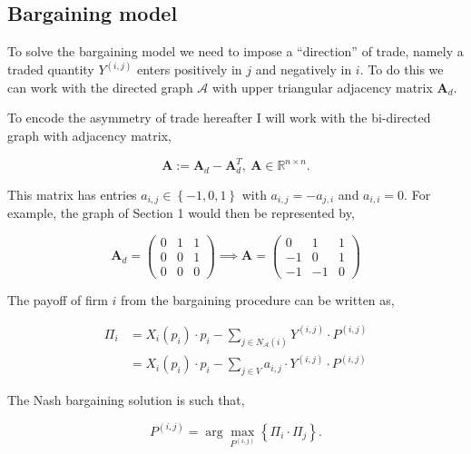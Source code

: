 \documentclass[american]{scrartcl}
\newcommand{\R}{\mathbb{R}}
\newcommand{\matr}[1]{\bm{#1}}
\newcommand{\set}[1]{\left\{#1\right\}}
\begin{document}
\subsection{Bargaining model}

To solve the bargaining model we need to impose a ``direction'' of trade, namely a traded quantity $Y^{(i, j)}$ enters positively in $j$ and negatively in $i$. To do this we can work with the directed graph $\mathcal{A}$ with upper triangular adjacency matrix $\matr{A}_{d}$.

To encode the asymmetry of trade hereafter I will work with the bi-directed graph with adjacency matrix,

\begin{equation}
	\matr{A} := \matr{A}_{d} - \matr{A}_{d}^T,  \ \matr{A} \in\R^{n\times n}.
\end{equation}

This matrix has entries $a_{i, j} \in \set{-1, 0, 1}$ with $a_{i, j} = - a_{j, i}$ and $a_{i, i} = 0$. For example, the graph of Section 1 would then be represented by,

\begin{equation}
	\matr{A}_d= \begin{pmatrix}
		0 & 1 & 1 \\
		0 & 0 & 1 \\
		0 & 0 & 0
	\end{pmatrix} \implies
	\matr{A} = \begin{pmatrix}
		0  & 1  & 1 \\
		-1 & 0  & 1 \\
		-1 & -1 & 0
	\end{pmatrix}
\end{equation}

The payoff of firm $i$ from the bargaining procedure can be written as,

\begin{equation}
	\begin{split}
		\Pi_i &= X_i(p_i)\cdot p_i - \sum_{j \in N_{\mathcal{A}}(i)} Y^{(i, j)} \cdot P^{(i, j)} \\
		&= X_i(p_i)\cdot p_i - \sum_{j \in V} a_{i, j} \cdot Y^{(i, j)} \cdot P^{(i, j)}
	\end{split}
\end{equation}

The Nash bargaining solution is such that,

\begin{equation}
	P^{(i, j)} = \arg \max_{P^{(i, j)}} \left\{\Pi_i \cdot \Pi_j \right\}.
\end{equation}
\end{document}
